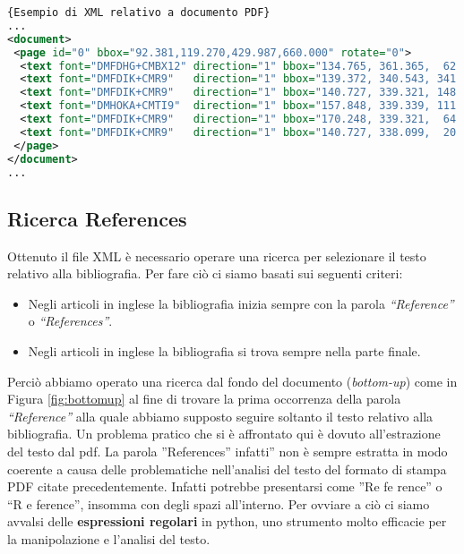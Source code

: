 \begin{lstlisting}[language=XML,frame=r,caption=\textit{Esempio di XML relativo a documento PDF} ,breaklines=true,basicstyle=\small]{Esempio di XML relativo a documento PDF}
...
<document>
 <page id="0" bbox="92.381,119.270,429.987,660.000" rotate="0">
  <text font="DMFDHG+CMBX12" direction="1" bbox="134.765, 361.365,  62.920, 11.955" size="11.955">References</text>
  <text font="DMFDIK+CMR9"   direction="1" bbox="139.372, 340.543, 341.146,  8.966" size="8.966">1. J.-F. Arias, C.P. Lai, S. Surya, R. Kasturi, and A.K. Chhabra. Interpretation of</text>
  <text font="DMFDIK+CMR9"   direction="1" bbox="140.727, 339.321, 148.241,  8.966" size="8.966">telephone system manhole drawings.</text>
  <text font="DMHOKA+CMTI9"  direction="1" bbox="157.848, 339.339, 111.177,  8.966" size="8.966">Pattern Recognition Letters</text>
  <text font="DMFDIK+CMR9"   direction="1" bbox="170.248, 339.321,  64.383,  8.966" size="8.966">, 16(1):355&#8211;359,</text>
  <text font="DMFDIK+CMR9"   direction="1" bbox="140.727, 338.099,  20.990,  8.966" size="8.966">1995.</text>
 </page>
</document>
...
\end{lstlisting}



\subsection{Ricerca References}\label{sec:ricercaref}

Ottenuto il file XML è necessario operare una ricerca per selezionare il testo relativo alla bibliografia.
Per fare ciò ci siamo basati sui seguenti criteri:
\begin{itemize}
 \item Negli articoli in inglese la bibliografia inizia sempre con la parola \textit{``Reference''} o \textit{``References''}.
 \item Negli articoli in inglese la bibliografia si trova sempre nella parte finale.
\end{itemize}

Perciò abbiamo operato una ricerca dal fondo del documento (\textit{bottom-up}) come in Figura \ref{fig:bottomup} al fine di trovare la prima occorrenza della parola \textit{``Reference''} alla quale abbiamo supposto seguire soltanto il testo relativo alla bibliografia. 
Un problema pratico che si è affrontato qui è dovuto all'estrazione del testo dal pdf. La parola ''References'' infatti'' non è sempre estratta in modo coerente a causa delle problematiche nell'analisi del testo del formato di stampa PDF citate precedentemente. Infatti potrebbe presentarsi come ''Re fe rence'' o ``R e ference'', insomma con degli spazi all'interno. Per ovviare a ciò ci siamo avvalsi delle\textbf{ espressioni regolari} in python, uno strumento molto efficacie per la manipolazione e l'analisi del testo.

